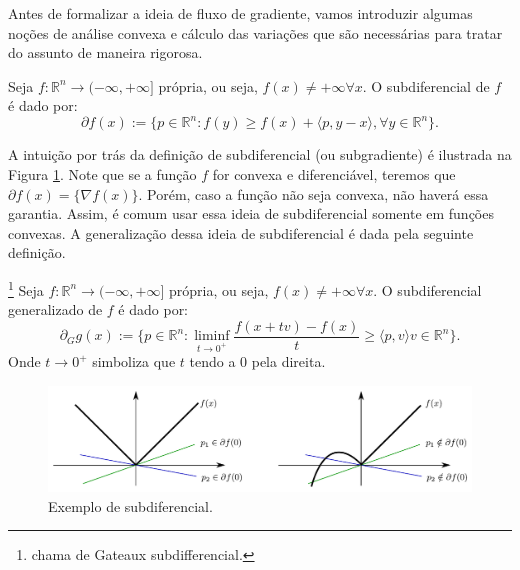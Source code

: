 Antes de formalizar a ideia de fluxo de gradiente, vamos introduzir algumas
noções de análise convexa e cálculo das variações que são necessárias para tratar
do assunto de maneira rigorosa.

\begin{definition}[Subdiferencial]
    Seja $f:\mathbb R^n \to (-\infty, +\infty]$ própria, ou seja, $f(x) \neq +\infty \forall x$.
    O subdiferencial de $f$ é dado por:
    \begin{equation}
        \partial f(x) := \{p \in \mathbb R^n:
        f(y) \geq f(x) + \langle p, y-x\rangle, \forall y \in \mathbb R^n
        \}.
    \end{equation}
\end{definition}
A intuição por trás da definição
de subdiferencial (ou subgradiente) é ilustrada na Figura \ref{fig:subdiferencial}.
Note que se a função $f$ for convexa e diferenciável, teremos que $\partial f(x) = \{\nabla f(x)\}$.
Porém, caso a função não seja convexa, não haverá essa garantia. Assim, é comum usar essa ideia de
subdiferencial somente em funções convexas. A generalização dessa ideia de subdiferencial é dada
pela seguinte definição.

\begin{definition}
    \footnote{\citet{ambrosio2021lectures} chama de Gateaux subdifferencial.}
    Seja $f:\mathbb R^n \to (-\infty, +\infty]$ própria, ou seja, $f(x) \neq +\infty \forall x$.
    O subdiferencial generalizado de $f$ é dado por:
    \begin{equation}
        \partial_G g(x):= \{p \in \mathbb R^n: \liminf_{t\to 0^+}\frac{f(x+tv) - f(x)}{t}
        \geq \langle p,v \rangle v \in \mathbb R^n\}.
    \end{equation}
    Onde $t \to 0^+$ simboliza que $t$ tendo a $0$ pela direita.
\end{definition}

\begin{figure}[H]
    \includegraphics[width=1\textwidth]{./Figures/subdiferencial}
    \caption{Exemplo de subdiferencial.}
    \label{fig:subdiferencial}
\end{figure}
